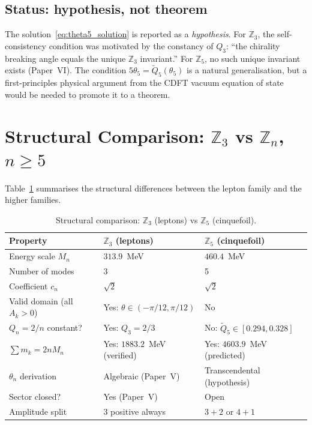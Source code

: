 \documentclass[11pt]{article}
\begin{document}
\subsection{Status: hypothesis, not theorem}

The solution~\eqref{eq:theta5_solution} is reported as a \emph{hypothesis}.
For $\mathbb{Z}_3$, the self-consistency condition was motivated by the
constancy of $Q_3$: ``the chirality breaking angle equals the unique
$\mathbb{Z}_3$ invariant.''
For $\mathbb{Z}_5$, no such unique invariant exists (Paper~VI).
The condition $5\theta_5 = \tilde{Q}_5(\theta_5)$ is a natural
generalisation, but a first-principles physical argument from the CDFT
vacuum equation of state would be needed to promote it to a theorem.


\section{Structural Comparison: $\mathbb{Z}_3$ vs $\mathbb{Z}_n$, $n \geq 5$}
\label{sec:comparison}

Table~\ref{tab:comparison} summarises the structural differences between
the lepton family and the higher families.

\begin{table}[h]
  \caption{Structural comparison: $\mathbb{Z}_3$ (leptons) vs $\mathbb{Z}_5$ (cinquefoil).}
  \label{tab:comparison}
  \begin{tabular}{lll}
    \toprule
    Property & $\mathbb{Z}_3$ (leptons) & $\mathbb{Z}_5$ (cinquefoil) \\
    \midrule
    Energy scale $M_n$ & $313.9$~MeV & $460.4$~MeV \\
    Number of modes & 3 & 5 \\
    Coefficient $c_n$ & $\sqrt{2}$ & $\sqrt{2}$ \\
    Valid domain (all $A_k > 0$) & Yes: $\theta \in (-\pi/12, \pi/12)$ & No \\
    $Q_n = 2/n$ constant? & Yes: $Q_3 = 2/3$ & No: $\tilde{Q}_5 \in [0.294, 0.328]$ \\
    $\sum m_k = 2nM_n$ & Yes: $1883.2$~MeV (verified) & Yes: $4603.9$~MeV (predicted) \\
    $\theta_n$ derivation & Algebraic (Paper~V) & Transcendental (hypothesis) \\
    Sector closed? & Yes (Paper~V) & Open \\
    Amplitude split & 3 positive always & $3+2$ or $4+1$ \\
    \bottomrule
  \end{tabular}
\end{table}
\end{document}
